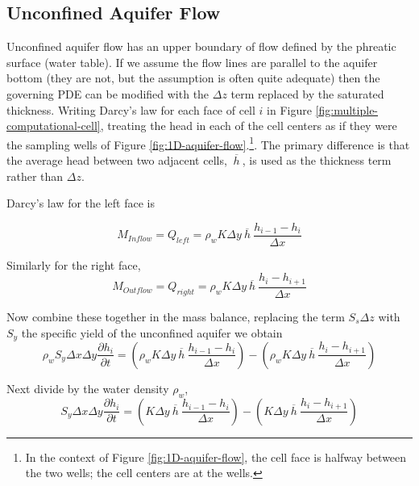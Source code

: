 \subsection{Unconfined Aquifer Flow}
Unconfined aquifer flow has an upper boundary of flow defined by the phreatic surface (water table).  
If we assume the flow lines are parallel to the aquifer bottom (they are not, but the assumption is often quite adequate) then the governing PDE can be modified with the $\Delta z$ term replaced by the saturated thickness.
Writing Darcy's law for each face of cell $i$ in Figure \ref{fig:multiple-computational-cell}, treating the head in each of the cell centers as if they were the sampling wells of Figure \ref{fig:1D-aquifer-flow}.\footnote{In the context of Figure \ref{fig:1D-aquifer-flow}, the cell face is halfway between the two wells; the cell centers are at the wells.}.  The primary difference is that the average head between two adjacent cells, $~\overline{h}~$, is used as the thickness term rather than $\Delta z$.

Darcy's law for the left face is 

\begin{equation}
M_{Inflow} = Q_{left} =\rho_{w} K \Delta y ~\overline{h}~ \frac{h_{i-1} - h_{i}}{\Delta x}
\end{equation}
 
Similarly for the right face, 
 \begin{equation}
M_{Outflow} = Q_{right} =\rho_{w} K \Delta y ~\overline{h}~ \frac{h_{i} - h_{i+1}}{\Delta x}
\end{equation}

Now combine these together in the mass balance, replacing the term $S_{s} \Delta z$ with $S_y$ the specific yield of the unconfined aquifer we obtain
 \begin{equation}
\rho_{w} S_{y} \Delta x \Delta y  \frac{\partial h_i}{\partial t} = 
(\rho_{w} K \Delta y ~\overline{h}~ \frac{h_{i-1} - h_{i}}{\Delta x}) - 
(\rho_{w} K \Delta y ~\overline{h}~ \frac{h_{i} - h_{i+1}}{\Delta x})
\end{equation}

Next divide by the water density $\rho_{w}$,
 \begin{equation}
S_{y} \Delta x \Delta y \frac{\partial h_i}{\partial t} = 
(K \Delta y ~\overline{h}~ \frac{h_{i-1} - h_{i}}{\Delta x}) - 
(K \Delta y ~\overline{h}~ \frac{h_{i} - h_{i+1}}{\Delta x})
\label{eqn:finite-difference-structure}
\end{equation}

